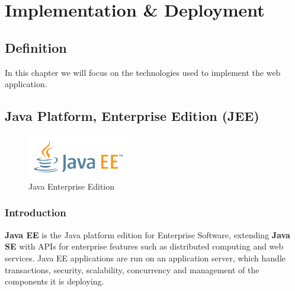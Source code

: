 
	
\chapter{Implementation \& Deployment}

	\section{Definition}
	
	In this chapter we will focus on the technologies used to implement the web application. 

	\section{Java Platform, Enterprise Edition (JEE)}
		\begin{figure}[h]
		\centering
		\includegraphics[width=0.4\textwidth]{JAVAEE_logo.png}
		\caption{Java Enterprise Edition}
		
	    \end{figure}

\subsection{Introduction}
\textbf{Java EE} is the Java platform edition for Enterprise Software, extending \textbf{Java SE} with APIs for enterprise features such as distributed computing and web services. Java EE applications are run on an application server, which handle transactions, security, scalability, concurrency and management of the components it is deploying.
\\
\\

